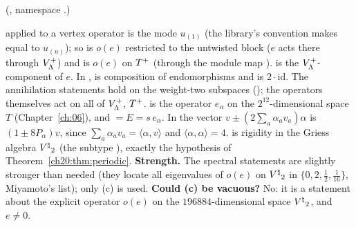 (, namespace .)
\begin{dictionary}
 applied to a vertex operator is the mode $u_{(1)}$ (the library's convention 
makes  equal to $u_{(n)}$); so  is $o(e)$ restricted to the untwisted block
($e$ acts there through $V_{\Lambda}^{+}$) and  is $o(e)$ on $T^{+}$ (through the module map
).   is the $V_{\Lambda}^{+}$-component of $e$.  In
, \lean{*} is composition of endomorphisms and  is $2\cdot\mathrm{id}$.  The
annihilation statements hold on the weight-two subspaces (); the operators themselves act on all of
$V_{\Lambda}^{+}$, $T^{+}$.   is the operator $e_\alpha$ on the $2^{12}$-dimensional space $T$
(Chapter~\ref{ch:06}), and  $=E=s\,e_\alpha$.  In  the vector
$v\pm(2\sum_a\alpha_av_a)\alpha$ is $(1\pm8P_\alpha)v$, since $\sum_a\alpha_av_a=\langle\alpha,v\rangle$ and $\langle\alpha,\alpha\rangle=4$.
 is rigidity in the Griess algebra ${V^{\natural}}_2$ (the subtype ), exactly the
hypothesis  of Theorem~\ref{ch20:thm:periodic}.  \textbf{Strength.}  The spectral statements are slightly
stronger than needed (they locate all eigenvalues of $o(e)$ on ${V^{\natural}}_2$ in $\{0,2,\tfrac12,\tfrac1{16}\}$, Miyamoto's
list); only (c) is used.  \textbf{Could (c) be vacuous?}  No: it is a statement about the explicit operator $o(e)$ on the
$196884$-dimensional space ${V^{\natural}}_2$, and $e\ne0$.
\end{dictionary}

